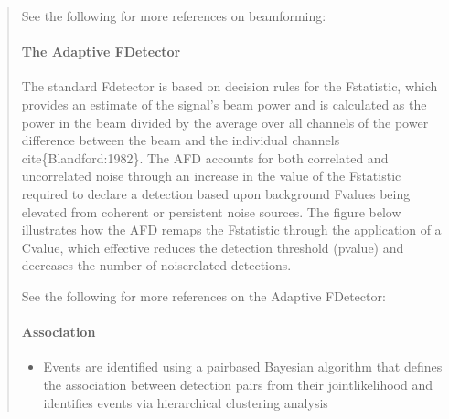 \documentclass[letterpaper,10pt,english]{sphinxmanual}
\begin{document}
\begin{itemize}
\begin{quote}
See the following for more references on beamforming:


\paragraph{The Adaptive F\sphinxhyphen{}Detector}
\label{\detokenize{detection:the-adaptive-f-detector}}\label{\detokenize{detection:afd}}\label{\detokenize{detection::doc}}
The standard F\sphinxhyphen{}detector is based on decision rules for the F\sphinxhyphen{}statistic, which provides an estimate of the signal’s beam power and is calculated as the power in the beam divided by the average over all channels of the power difference between the beam and the individual channels cite\{Blandford:1982\}.  The AFD accounts for both correlated and uncorrelated noise through an increase in the value of the F\sphinxhyphen{}statistic required to declare a detection based upon background F\sphinxhyphen{}values being elevated from coherent or persistent noise sources. The figure below illustrates how the AFD remaps the F\sphinxhyphen{}statistic through the application of a C\sphinxhyphen{}value, which effective reduces the detection threshold (p\sphinxhyphen{}value) and decreases the number of noise\sphinxhyphen{}related detections.

\noindent{}

See the following for more references on the Adaptive F\sphinxhyphen{}Detector:



\paragraph{Association}
\label{\detokenize{association:association}}\label{\detokenize{association:id1}}\label{\detokenize{association::doc}}\begin{itemize}
\item {} 
Events are identified using a pair\sphinxhyphen{}based Bayesian algorithm that defines the association between detection pairs from their joint\sphinxhyphen{}likelihood and identifies events via hierarchical clustering analysis


\end{itemize}
\end{quote}
\end{itemize}
\end{document}

